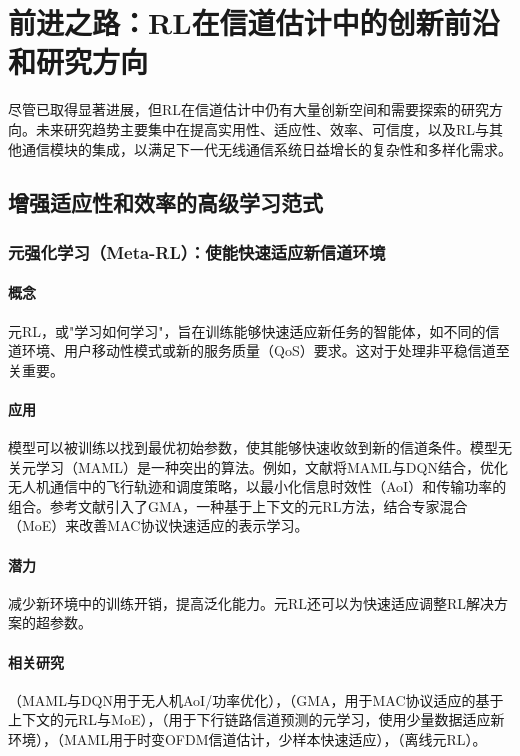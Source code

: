 \documentclass[journal]{IEEEtran}
\begin{document}
\section{前进之路：RL在信道估计中的创新前沿和研究方向}

尽管已取得显著进展，但RL在信道估计中仍有大量创新空间和需要探索的研究方向。未来研究趋势主要集中在提高实用性、适应性、效率、可信度，以及RL与其他通信模块的集成，以满足下一代无线通信系统日益增长的复杂性和多样化需求。

\subsection{增强适应性和效率的高级学习范式}

\subsubsection{元强化学习（Meta-RL）：使能快速适应新信道环境}

\paragraph{概念} 
元RL，或"学习如何学习"，旨在训练能够快速适应新任务的智能体，如不同的信道环境、用户移动性模式或新的服务质量（QoS）要求\cite{ref48}。这对于处理非平稳信道至关重要。

\paragraph{应用} 
模型可以被训练以找到最优初始参数，使其能够快速收敛到新的信道条件\cite{ref48}。模型无关元学习（MAML）是一种突出的算法\cite{ref48}。例如，文献\cite{ref48}将MAML与DQN结合，优化无人机通信中的飞行轨迹和调度策略，以最小化信息时效性（AoI）和传输功率的组合。参考文献\cite{ref49}引入了GMA，一种基于上下文的元RL方法，结合专家混合（MoE）来改善MAC协议快速适应的表示学习。

\paragraph{潜力} 
减少新环境中的训练开销，提高泛化能力\cite{ref48}。元RL还可以为快速适应调整RL解决方案的超参数\cite{ref48}。

\paragraph{相关研究} 
\cite{ref48}（MAML与DQN用于无人机AoI/功率优化），\cite{ref49}（GMA，用于MAC协议适应的基于上下文的元RL与MoE），\cite{ref54}（用于下行链路信道预测的元学习，使用少量数据适应新环境），\cite{ref52}（MAML用于时变OFDM信道估计，少样本快速适应），\cite{ref50}（离线元RL）。
\end{document}
